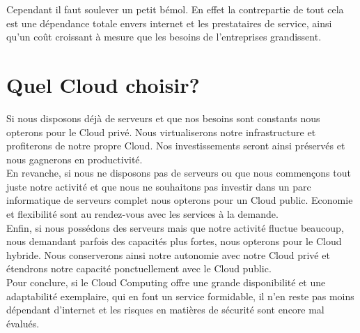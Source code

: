   Cependant il faut soulever un petit bémol. En effet la contrepartie de tout cela est une dépendance totale envers internet et les prestataires de service, ainsi qu’un coût croissant à mesure que les besoins de l’entreprises grandissent.

  \section{Quel Cloud choisir?}
  Si nous disposons déjà de serveurs et que nos besoins sont constants nous opterons pour le Cloud privé. Nous virtualiserons notre infrastructure et profiterons de notre propre Cloud. Nos investissements seront ainsi préservés et nous gagnerons en productivité.\\

  En revanche, si nous ne disposons pas de serveurs ou que nous commençons tout juste notre activité et que nous ne souhaitons pas investir dans un parc informatique de serveurs complet nous opterons pour un Cloud public. Economie et flexibilité sont au rendez-vous avec les services à la demande.\\

  Enfin, si nous possédons des serveurs mais que notre activité fluctue beaucoup, nous demandant parfois des capacités plus fortes, nous opterons pour le Cloud hybride. Nous conserverons ainsi notre autonomie avec notre Cloud privé et étendrons notre capacité ponctuellement avec le Cloud public.\\

  Pour conclure, si le Cloud Computing offre une grande disponibilité et une adaptabilité exemplaire, qui en font un service formidable, il n’en reste pas moins dépendant d’internet et les risques en matières de sécurité sont encore mal évalués.
